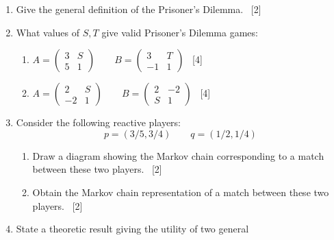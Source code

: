 \documentclass[12pt,a4paper]{article}
\begin{document}
\begin{enumerate}
\begin{enumerate}
        \item Give the general definition of the Prisoner's Dilemma.
            ~\hfill{[2]}
        \item What values of $S, T$ give valid Prisoner's Dilemma games:
            \begin{enumerate}
                \item  \(A =
                         \begin{pmatrix}
                            3 & S\\
                            5 & 1
                         \end{pmatrix}
                         \qquad
                         B =
                         \begin{pmatrix}
                            3 & T\\
                            -1 & 1
                         \end{pmatrix}
                       \)
                ~\hfill{[4]}
                \item  \(A =
                         \begin{pmatrix}
                            2 & S\\
                            -2 & 1
                         \end{pmatrix}
                         \qquad
                         B =
                         \begin{pmatrix}
                            2 & -2\\
                            S & 1
                         \end{pmatrix}
                       \)
                ~\hfill{[4]}
            \end{enumerate}
        \item Consider the following reactive players:
            \[p = (3/5, 3/4)\qquad q = (1/2, 1/4)\]
            \begin{enumerate}
                \item Draw a diagram showing the Markov chain corresponding to a
                    match between these two players.
                    ~\hfill{[2]}
                \item Obtain the Markov chain representation of a match between
                    these two players.
                    ~\hfill{[2]}
            \end{enumerate}
        \item State a theoretic result giving the utility of two general

\end{enumerate}
\end{enumerate}
\end{document}
